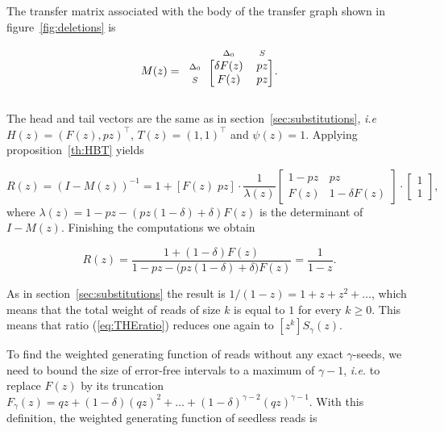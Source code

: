 \documentclass{article}
\newcommand{\smS}{\scriptstyle{S}}
\newcommand{\smDELz}{\scriptstyle{\Delta_0}}
\begin{document}
The transfer matrix associated with the body of the transfer graph shown
in figure~\ref{fig:deletions} is

\begin{equation*}
M(z) = 
\begin{blockarray}{ccc}
       & \smDELz & \smS \\
\begin{block}{c[cc]}
\smDELz & \delta F(z) & pz \\
\smS    &        F(z) & pz \\
\end{block}
\end{blockarray}.
\end{equation*}

The head and tail vectors are the same as in
section~\ref{sec:substitutions}, \textit{i.e}
$H(z) = (F(z), pz)^\top$, $T(z) = (1,1)^\top$ and $\psi(z) = 1$.
Applying proposition~\ref{th:HBT} yields

\begin{equation*}
R(z) = (I-M(z))^{-1} =
1 + [F(z) \; pz] \cdot \frac{1}{\lambda(z)}
\begin{bmatrix}
1-pz  & pz              \\
F(z) & 1 -\delta F(z)
\end{bmatrix}
\cdot \begin{bmatrix}1 \\ 1\end{bmatrix},
\end{equation*}
where $\lambda(z) = 1-pz-(pz(1-\delta)+\delta)F(z)$ is the determinant of
$I-M(z)$. Finishing the computations we obtain

\begin{equation}
\label{eq:Rdel}
R(z) = \frac{1+(1-\delta)F(z)} {1-pz - \big(pz(1-\delta) + \delta\big)F(z)}
= \frac{1}{1-z}.
\end{equation}

As in section~\ref{sec:substitutions} the result is $1/(1-z) = 1+z +z^2 +
\ldots$, which means that the total weight of reads of size $k$ is equal
to $1$ for every $k \geq 0$. This means that ratio (\ref{eq:THEratio})
reduces one again to $[z^k]S_\gamma(z)$.

To find the weighted generating function of reads without any exact
$\gamma$-seeds, we need to bound the size of error-free intervals to a
maximum of $\gamma-1$, \textit{i.e.} to replace $F(z)$ by its truncation
$F_\gamma(z) = qz + (1-\delta)(qz)^2 + \ldots +
(1-\delta)^{\gamma-2}(qz)^{\gamma-1}$. With this definition, the weighted
generating function of seedless reads is
\end{document}
